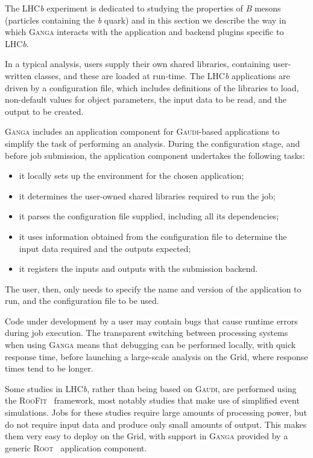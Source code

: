 \documentclass{elsart}
\def\lhcb {LHC{\em b\/}\xspace}
\def\ganga {\textsc{Ganga}\xspace}
\def\root {\textsc{Root}\xspace}
\def\gaudi {\textsc{Gaudi}\xspace}
\def\grid {Grid\xspace}
\def\roofit{\textsc{RooFit}\xspace}
\begin{document}
The \lhcb experiment is dedicated to studying the properties of \textit{B}
mesons (particles containing the \textit{b} quark) and in this section we
describe the way in which \ganga interacts with the application and
backend plugins specific to \lhcb.

In a typical analysis, users supply their own shared libraries, containing
user-written classes, and these are loaded at run-time. 
The \lhcb applications are driven by a configuration file,
which includes definitions of the libraries to load, non-default values for
object parameters, the input data to be read, and the output to be created.

\ganga includes an application component for \gaudi-based applications to simplify
the task of performing an analysis. During the configuration stage, and before
job submission, the application component undertakes the following tasks:
\begin{itemize}
\item it locally sets up the environment for the chosen application;
\item it determines the user-owned shared libraries required to
  run the job;
\item it parses the configuration file supplied, including all its dependencies;
\item it uses information obtained from the configuration file to determine
  the input data required and the outputs expected;
\item it registers the inputs and outputs with the submission backend.
\end{itemize}
The user, then, only needs to specify the name and
version of the application to run, and the configuration file to be used.

Code under development by a user may contain bugs that cause
runtime errors during job execution. The transparent switching between
processing systems when using \ganga means that debugging can be
performed locally, with quick response time, before launching a large-scale
analysis on the \grid, where response times tend to be longer.

Some studies in \lhcb, rather than being based on \gaudi, are performed using
the \roofit~\cite{RooFit} framework, most notably studies that make use of
simplified event simulations.   Jobs for these studies require large amounts
of processing power, but do not require
input data and produce only small amounts of output. This makes them
very easy to deploy on the \grid, with support in \ganga provided by a
generic \root~\cite{ROOT} application component.
\end{document}
